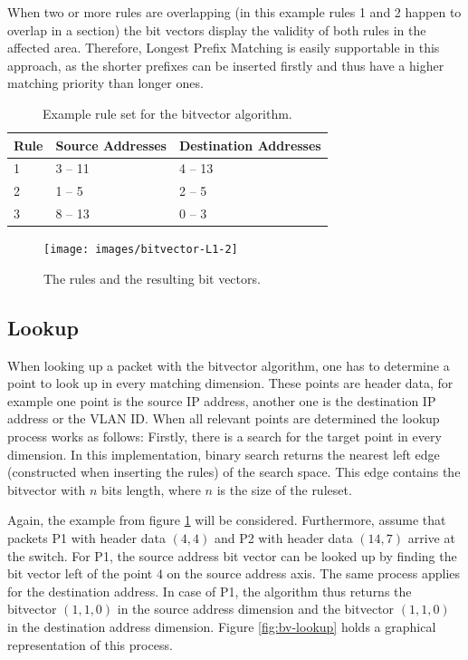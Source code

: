 \documentclass[a4paper,
		12pt,
		parskip=full,
		titlepage
		]{scrartcl}
\begin{document}
When two or more rules are overlapping (in this example rules 1 and 2 happen 
to overlap in a section) the bit vectors display the validity of both rules in the affected area.
Therefore, Longest Prefix Matching is easily supportable in this approach, 
as the shorter prefixes can be inserted firstly and thus have a higher matching priority than longer ones.

\begin{table}
  \centering
  \begin{tabularx}{\textwidth}{l|X|X}
  Rule&Source Addresses&Destination Addresses\\
  \hline
  1&3 -- 11&4 -- 13\\
  2&1 -- 5&2 -- 5\\
  3&8 -- 13&0 -- 3\\
  \end{tabularx}
  \caption{Example rule set for the bitvector algorithm.}
  \label{table:bv_ruleset}
\end{table}

\begin{figure}
\centering
\texttt{[image: images/bitvector-L1-2]}
\caption{The rules and the resulting bit vectors.}
\label{fig:bv-normal}
\end{figure}

\subsection{Lookup}
When looking up a packet with the bitvector algorithm, one has to determine a point to look up in every matching dimension.
These points are header data, for example one point is the source IP address, another one is the destination IP address or the VLAN ID.
When all relevant points are determined the lookup process works as follows:
Firstly, there is a search for the target point in every dimension.
In this implementation, binary search returns the nearest left edge (constructed when inserting the rules) of the search space.
This edge contains the bitvector with $n$ bits length, where $n$ is the size of the ruleset.

Again, the example from figure \ref{fig:bv-normal} will be considered.
Furthermore, assume that packets P1 with header data $(4, 4)$ and P2 with header data $(14, 7)$ arrive at the switch.
For P1, the source address bit vector can be looked up by finding the bit vector left of the point $4$ on the source address axis.
The same process applies for the destination address.
In case of P1, the algorithm thus returns the bitvector $(1, 1, 0)$ in the source address dimension and the bitvector $(1, 1, 0)$ in the destination address dimension.
Figure \ref{fig:bv-lookup} holds a graphical representation of this process.
\end{document}

